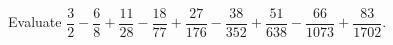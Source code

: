 Evaluate $\dfrac{3}{2}-\dfrac{6}{8}+\dfrac{11}{28}-\dfrac{18}{77}+\dfrac{27}{176}-\dfrac{38}{352}+\dfrac{51}{638}-\dfrac{66}{1073}+\dfrac{83}{1702}$.
